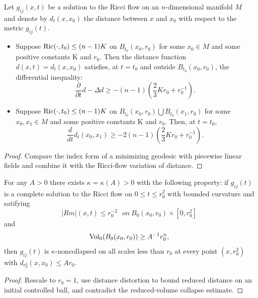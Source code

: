 \begin{lemma}
  \label{lem:cz-distance-distortion-under-ricci-flow}
Let $g_{ij}(x,t)$ be a solution to the Ricci flow on an
$n$-dimensional manifold $M$ and denote by $d_t(x,x_0)$ the
distance between $x$ and $x_0$ with respect to the metric
$g_{ij}(t)$.
\begin{itemize}
\item[(i)] Suppose $\operatorname{Ric}(\cdot,t_0)\leq(n-1)K$ on
$B_{t_0}(x_0,r_0)$ for some $x_0\in M$ and some positive constants
K and $r_0$. Then the distance function $d(x,t)=d_t(x,x_0)$
satisfies, at $t=t_0$ and outside $B_{t_0}(x_0,r_0)$, the
differential inequality:
$$
\frac{\partial}{\partial t}d-\Delta d
\geq-(n-1)\left(\frac{2}{3}Kr_0+r_0^{-1}\right).
$$
\item[(ii)] Suppose $\operatorname{Ric}(\cdot,t_0)\leq (n-1)K$ on
$B_{t_0}(x_0,r_0)\bigcup B_{t_0}(x_1,r_0)$ for some $x_0,x_1\in M$
and some positive constants K and $r_0$.  Then, at $t=t_0$,
$$
\frac{d}{dt}d_t(x_0,x_1)\geq-2(n-1)\left(\frac{2}{3}Kr_0+r_0^{-1}\right).
$$
\end{itemize}
\end{lemma}

\begin{proof}
  \sketch Compare the index form of a minimizing geodesic with piecewise linear fields and combine it with the Ricci-flow variation of distance.
\end{proof}

\begin{theorem}
  \label{thm:cz-no-local-collapsing-for-complete-flows}
For any $A >0$ there exists $\kappa=\kappa(A)>0$ with the
following property: if $g_{ij}(t)$ is a complete solution to the
Ricci flow on $0\leq t\leq r_0^2$ with bounded curvature and
satifying
$$
|Rm|(x,t)\leq r_0^{-2}\ \ \ on \ B_0(x_0,r_0)\times [0,r_0^2]
$$
and
$$
\operatorname{Vol}_0(B_0(x_0,r_0))\geq A^{-1}r_0^n,
$$
then $g_{ij}(t)$ is $\kappa$-noncollapsed on all scales less than
$r_0$ at every point $(x,r_0^2)$ with $d_{r_0^2}(x,x_0)\leq Ar_0$.
\end{theorem}

\begin{proof}
  \sketch Rescale to $r_0=1$, use distance distortion to bound reduced distance on an initial controlled ball, and contradict the reduced-volume collapse estimate.
\end{proof}
